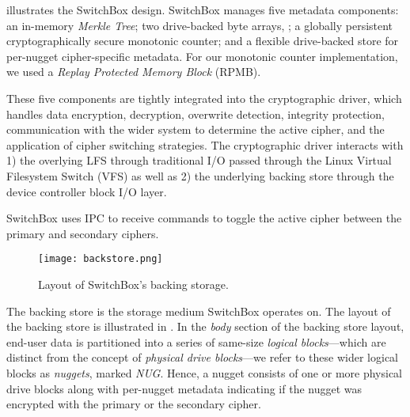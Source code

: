  illustrates the SwitchBox design. SwitchBox manages five
metadata components: an in-memory \emph{Merkle Tree}; two drive-backed byte
arrays, ; a
globally persistent cryptographically secure monotonic counter; and a flexible
drive-backed store for per-nugget cipher-specific metadata. For our monotonic
counter implementation, we used a \emph{Replay Protected Memory Block} (RPMB).

These five components are tightly integrated into the cryptographic driver,
which handles data encryption, decryption, overwrite detection, integrity
protection, communication with the wider system to determine the active cipher,
and the application of cipher switching strategies. The cryptographic driver
interacts with 1) the overlying LFS through traditional I/O passed through the
Linux Virtual Filesystem Switch (VFS) as well as 2) the underlying backing store
through the device controller block I/O layer.

SwitchBox uses IPC to receive commands to toggle the active cipher between the
primary and secondary ciphers. 

\begin{figure}[t]
 \centering
 \texttt{[image: backstore.png]}
  \caption{Layout of SwitchBox's backing storage.}\label{fig:backstore2}
\end{figure}

The backing store is the storage medium SwitchBox operates on. The layout of the
backing store is illustrated in . In the \textit{body} section
of the backing store layout, end-user data is partitioned into a series of
same-size \emph{logical blocks}---which are distinct from the concept of
\emph{physical drive blocks}---we refer to these wider logical blocks as
\emph{nuggets}, marked \textit{NUG}. Hence, a nugget consists of one or more
physical drive blocks along with per-nugget metadata indicating if the nugget
was encrypted with the primary or the secondary cipher. 

